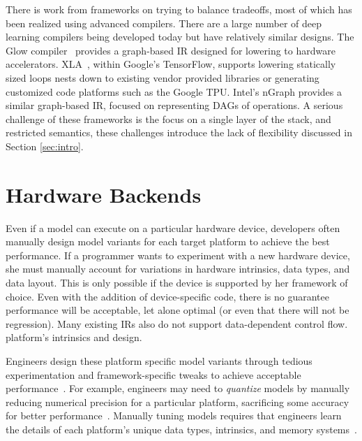 There is work from frameworks on trying to balance tradeoffs, most of which has
  been realized using advanced compilers.
There are a large number of deep learning compilers being
  developed today but have relatively similar designs.
The Glow compiler~\citep{glow} provides a graph-based IR designed for lowering
  to hardware accelerators.
XLA~\citep{xla}, within Google's TensorFlow, supports lowering statically sized
  loops nests down to existing vendor provided libraries or generating customized
  code platforms such as the Google TPU.
Intel's nGraph provides a similar graph-based IR, focused on representing DAGs
  of operations.
A serious challenge of these frameworks is the focus on a single layer of the
  stack, and restricted semantics, these challenges introduce the lack of
  flexibility discussed in Section \ref{sec:intro}.

\section{Hardware Backends}

Even if a model can execute on
  a particular hardware device, developers
  often manually design model
  variants for each target platform
  to achieve the best performance.
If a programmer wants to experiment with a new hardware device,
  she must manually account for variations in hardware intrinsics, data
  types, and data layout.
This is only possible if the device is supported by her framework of choice.
Even with the addition of device-specific code,
  there is no guarantee performance will be acceptable, let alone optimal
  (or even that there will not be regression).
Many existing IRs also do not support data-dependent control flow.
  platform's intrinsics and design.

Engineers design these platform specific model variants
  through tedious experimentation and framework-specific tweaks
  to achieve acceptable performance~\citep{mobilenet}. %
For example,
  engineers may need to \textit{quantize} models
  by manually reducing numerical precision for a particular platform,
  sacrificing some accuracy for better performance~\citep{xnornet}.
Manually tuning models requires
  that engineers learn the details of
  each platform's
  unique data types, intrinsics, and memory systems~\citep{fb_fp_hw, tpuv1, brainwave, nn_on_si}.

